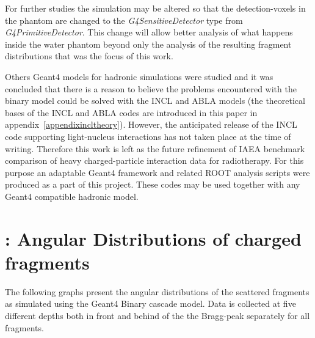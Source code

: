 For further studies the simulation may be altered so that the detection-voxels in the phantom are changed to the \textit{G4SensitiveDetector} type from \textit{G4PrimitiveDetector}. This change will allow better analysis of what happens inside the water phantom beyond only the analysis of the resulting fragment distributions that was the focus of this work.

Others Geant4 models for hadronic simulations were studied and it was concluded that there is a reason to believe the problems encountered with the binary model could be solved with the INCL and ABLA models (the theoretical bases of the INCL and ABLA codes are introduced in this paper in appendix~\ref{appendixincltheory}). However, the anticipated release of the INCL code supporting light-nucleus interactions has not taken place at the time of writing. Therefore this work is left as the future refinement of IAEA benchmark comparison of heavy charged-particle interaction data for radiotherapy. For this purpose an adaptable Geant4 framework and related ROOT analysis scripts were produced as a part of this project. These codes may be used together with any Geant4 compatible hadronic model.

\clearpage

  

\appendix 

\clearpage
{}
\section{\label{AppendixA}: Angular Distributions of charged fragments\label{AngularDistributionAppendix}}

The following graphs present the angular distributions of the scattered fragments as simulated using the Geant4 Binary cascade model. Data is collected at five different depths both in front and behind of the the Bragg-peak separately for all fragments.

\renewcommand{\theequation}{A\arabic{equation}}
\setcounter{equation}{0}  
\renewcommand{\thefigure}{A\arabic{figure}}
\setcounter{figure}{0}
\renewcommand{\thetable}{A\arabic{table}}
\setcounter{table}{0}
\renewcommand\thesection{A}
\setcounter{section}{1}

